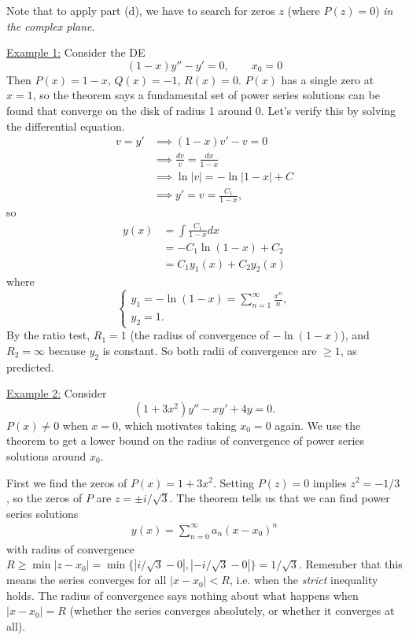 \documentclass[11pt, letterpaper, oneside]{article}     %
\numberwithin{equation}{subsection}
\theoremstyle{definition}
\numberwithin{theorem}{section}
\theoremstyle{remark}
\begin{document}
\begin{enumerate}
  Note that to apply part (d), we have to search for zeros $z$ (where $P(z) = 0$) \emph{in the complex plane}.

  \underline{Example 1:} Consider the DE
  \begin{equation}
    (1-x)y'' - y' = 0,\quad\quad x_0 = 0
  \end{equation}
  Then $P(x) = 1-x$, $Q(x) = -1$, $R(x) = 0$. $P(x)$ has a single zero at $x = 1$, so the theorem says a fundamental set of power series solutions can be found that converge on the disk of radius 1 around 0. Let's verify this by solving the differential equation.
  \begin{align}
    v = y' &\implies (1-x)v' - v = 0\\
    &\implies \frac{dv}{v} = \frac{dx}{1-x}\\
    &\implies \ln|v| = -\ln|1-x| + C\\
    &\implies y' = v = \frac{C_1}{1-x},
  \end{align}
  so
  \begin{align}
    y(x) &= \int \frac{C_1}{1-x}dx\\
    &= -C_1\ln(1-x) + C_2\\
    &= C_1y_1(x) + C_2y_2(x)
  \end{align}
  where
  \begin{equation}
    \begin{cases}
      y_1 = -\ln(1-x) = \sum_{n=1}^\infty\frac{x^n}{n},\\
      y_2 = 1.
    \end{cases}
  \end{equation}
  By the ratio test, $R_1 = 1$ (the radius of convergence of $-\ln(1-x)$), and $R_2 = \infty$ because $y_2$ is constant. So both radii of convergence are $\geq 1$, as predicted.

  \underline{Example 2:} Consider
  \begin{equation}
    (1+3x^2)y'' - xy' + 4y = 0.
  \end{equation}
  $P(x) \neq 0$ when $x = 0$, which motivates taking $x_0 = 0$ again. We use the theorem to get a lower bound on the radius of convergence of power series solutions around $x_0$.

  First we find the zeros of $P(x) = 1 + 3x^2$. Setting $P(z) = 0$ implies $z^2 = -1/3$, so the zeros of $P$ are $z = \pm i/\sqrt{3}$. The theorem tells us that we can find power series solutions
  \begin{align}
    y(x) = \sum_{n=0}^\infty a_n(x-x_0)^n
  \end{align}
  with radius of convergence $R \geq \min|z-x_0| = \min\{|i/\sqrt{3} - 0|,|-i/\sqrt{3} - 0|\} = 1/\sqrt{3}$. Remember that this means the series converges for all $|x-x_0| < R$, i.e. when the \emph{strict} inequality holds. The radius of convergence says nothing about what happens when $|x-x_0| = R$ (whether the series converges absolutely, or whether it converges at all).


\end{enumerate}
\end{document}
